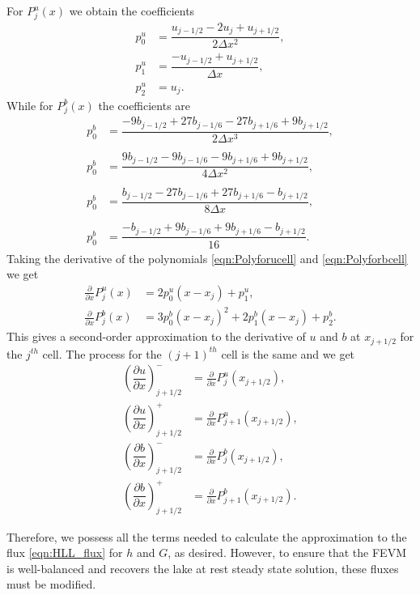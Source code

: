 For $P^u_j(x)$ we obtain the coefficients
\begin{align*}
p^u_0 &=  \dfrac{u_{j-1/2} - 2u_j + u_{j+1/2}}{2 \Delta x^2},\\
p^u_1 &=  \dfrac{-u_{j-1/2} + u_{j+1/2}}{\Delta x},\\
p^u_2 &=  u_j.
\end{align*}
While for $P^b_j(x)$ the coefficients are
\begin{align*}
p^b_0 &=  \dfrac{-9b_{j-1/2} + 27b_{j-1/6} - 27 b_{j+1/6} + 9b_{j+1/2}}{2 \Delta x^3},\\ \\
p^b_0 &=  \dfrac{9b_{j-1/2} - 9b_{j-1/6} - 9b_{j+1/6} + 9b_{j+1/2}}{4 \Delta x^2},\\ \\ 
p^b_0 &=  \dfrac{b_{j-1/2} - 27b_{j-1/6} + 27 b_{j+1/6} - b_{j+1/2}}{8 \Delta x},\\\\
p^b_0 &=  \dfrac{-b_{j-1/2}  + 9b_{j-1/6} + 9 b_{j+1/6} - b_{j+1/2}}{16}.
\end{align*}
Taking the derivative of the polynomials \eqref{eqn:Polyforucell} and \eqref{eqn:Polyforbcell} we get
	\begin{align*}
	\frac{\partial }{\partial x}P^u_j(x) &= 2p^u_0 \left(x - x_j\right) + p^u_1, \\
	\frac{\partial }{\partial x}P^b_j(x) &= 3p^b_0 \left(x - x_j\right)^2 + 2p^b_1 \left(x - x_j\right) + p^b_2.
	\end{align*}
This gives a second-order approximation to the derivative of $u$ and $b$ at $x_{j+1/2}$ for the $j^{th}$ cell. The process for the $(j+1)^{th}$ cell is the same and we get 
	\begin{align*}
	\left(\dfrac{\partial {u}}{\partial x} \right)^-_{j + 1/2} &= \frac{\partial }{\partial x}P^u_j(x_{j+1/2}),  \\
	\left(\dfrac{\partial {u}}{\partial x} \right)^+_{j + 1/2} &= \frac{\partial }{\partial x}P^u_{j+1}(x_{j+1/2}),  \\
	\left(\dfrac{\partial {b}}{\partial x} \right)^-_{j + 1/2} &= \frac{\partial }{\partial x}P^b_j(x_{j+1/2}), \\
	\left(\dfrac{\partial {b}}{\partial x} \right)^+_{j + 1/2} &= \frac{\partial }{\partial x}P^b_{j+1}(x_{j+1/2}). 	\end{align*}

Therefore, we possess all the terms needed to calculate the approximation to the flux \eqref{eqn:HLL_flux} for $h$ and $G$, as desired. However, to ensure that the FEVM is well-balanced and recovers the lake at rest steady state solution, these fluxes must be modified.


